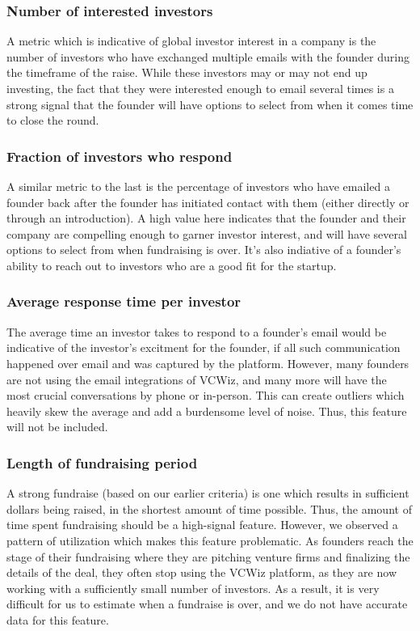 \subsubsection{Number of interested investors}

A metric which is indicative of global investor interest in a company is the number of investors who have exchanged multiple emails with the founder during the timeframe of the raise. While these investors may or may not end up investing, the fact that they were interested enough to email several times is a strong signal that the founder will have options to select from when it comes time to close the round.

\subsubsection{Fraction of investors who respond}

A similar metric to the last is the percentage of investors who have emailed a founder back after the founder has initiated contact with them (either directly or through an introduction). A high value here indicates that the founder and their company are compelling enough to garner investor interest, and will have several options to select from when fundraising is over. It's also indiative of a founder's ability to reach out to investors who are a good fit for the startup.

\subsubsection{Average response time per investor}

The average time an investor takes to respond to a founder's email would be indicative of the investor's excitment for the founder, if all such communication happened over email and was captured by the platform. However, many founders are not using the email integrations of VCWiz, and many more will have the most crucial conversations by phone or in-person. This can create outliers which heavily skew the average and add a burdensome level of noise. Thus, this feature will not be included.

\subsubsection{Length of fundraising period}

A strong fundraise (based on our earlier criteria) is one which results in sufficient dollars being raised, in the shortest amount of time possible. Thus, the amount of time spent fundraising should be a high-signal feature. However, we observed a pattern of utilization which makes this feature problematic. As founders reach the stage of their fundraising where they are pitching venture firms and finalizing the details of the deal, they often stop using the VCWiz platform, as they are now working with a sufficiently small number of investors. As a result, it is very difficult for us to estimate when a fundraise is over, and we do not have accurate data for this feature.

